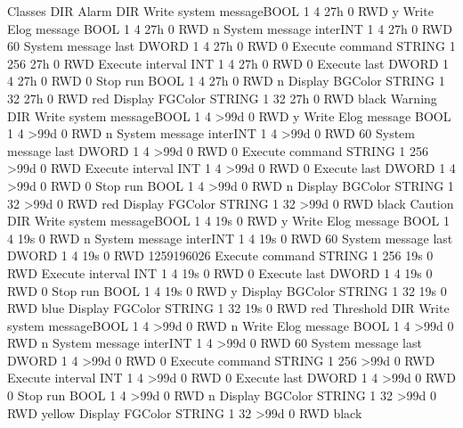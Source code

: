 \begin{DoxyCode}
   Classes                      DIR
        Alarm                   DIR
            Write system messageBOOL    1     4     27h  0   RWD  y
            Write Elog message  BOOL    1     4     27h  0   RWD  n
            System message interINT     1     4     27h  0   RWD  60
            System message last DWORD   1     4     27h  0   RWD  0
            Execute command     STRING  1     256   27h  0   RWD
            Execute interval    INT     1     4     27h  0   RWD  0
            Execute last        DWORD   1     4     27h  0   RWD  0
            Stop run            BOOL    1     4     27h  0   RWD  n
            Display BGColor     STRING  1     32    27h  0   RWD  red
            Display FGColor     STRING  1     32    27h  0   RWD  black
        Warning                 DIR
            Write system messageBOOL    1     4     >99d 0   RWD  y
            Write Elog message  BOOL    1     4     >99d 0   RWD  n
            System message interINT     1     4     >99d 0   RWD  60
            System message last DWORD   1     4     >99d 0   RWD  0
            Execute command     STRING  1     256   >99d 0   RWD
            Execute interval    INT     1     4     >99d 0   RWD  0
            Execute last        DWORD   1     4     >99d 0   RWD  0
            Stop run            BOOL    1     4     >99d 0   RWD  n
            Display BGColor     STRING  1     32    >99d 0   RWD  red
            Display FGColor     STRING  1     32    >99d 0   RWD  black
      Caution                 DIR
            Write system messageBOOL    1     4     19s  0   RWD  y
            Write Elog message  BOOL    1     4     19s  0   RWD  n
            System message interINT     1     4     19s  0   RWD  60
            System message last DWORD   1     4     19s  0   RWD  1259196026
            Execute command     STRING  1     256   19s  0   RWD
            Execute interval    INT     1     4     19s  0   RWD  0
            Execute last        DWORD   1     4     19s  0   RWD  0
            Stop run            BOOL    1     4     19s  0   RWD  y
            Display BGColor     STRING  1     32    19s  0   RWD  blue
            Display FGColor     STRING  1     32    19s  0   RWD  red
       Threshold               DIR
            Write system messageBOOL    1     4     >99d 0   RWD  n
            Write Elog message  BOOL    1     4     >99d 0   RWD  n
            System message interINT     1     4     >99d 0   RWD  60
            System message last DWORD   1     4     >99d 0   RWD  0
            Execute command     STRING  1     256   >99d 0   RWD
            Execute interval    INT     1     4     >99d 0   RWD  0
            Execute last        DWORD   1     4     >99d 0   RWD  0
            Stop run            BOOL    1     4     >99d 0   RWD  n
            Display BGColor     STRING  1     32    >99d 0   RWD  yellow
            Display FGColor     STRING  1     32    >99d 0   RWD  black
\end{DoxyCode}


